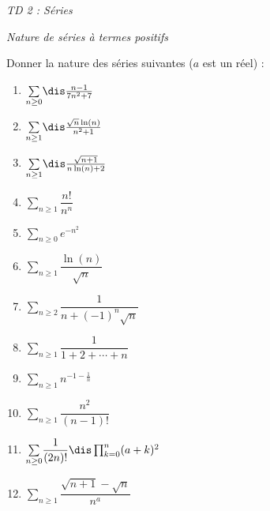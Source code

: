 \documentclass[a4paper,10pt]{report}
\newcommand{\Sum}[2]{\ensuremath{\textstyle{\sum\limits_{#1}^{#2}}}}
\begin{document}
\everymath{\displaystyle}
\begin{center}
\textit{{ {\huge TD 2 : Séries}}}
\end{center}
\bigskip


\begin{center}
\textit{{ {\large Nature de séries à termes positifs}}}
\end{center}


\begin{Exa} Donner la nature des séries suivantes ($a$ est un réel) :
\begin{multicols}{3}
\begin{enumerate}
\item $\Sum{n \geq 0}{} \dis\frac{n-1}{7n^2+7}$
\item $\Sum{n \geq 1}{}\dis\frac{\sqrt{n}\ln(n)}{n^2+1}$
\item $\Sum{n \geq 1}{}\dis\frac{\sqrt{n+1}}{n\ln(n)+2}$ 
\item $\Sum{n \geq 1}{} \dfrac{n!}{n^n} $
\columnbreak
\item $\Sum{n \geq 0}{} e^{-n^2} $
\item $\Sum{n \geq 1}{} \dfrac{\ln(n)}{\sqrt{n}} $
\item $\Sum{n \geq 2}{} \dfrac{1}{n+(-1)^n \sqrt{n}} $
\item $\Sum{n \geq 1}{} \dfrac{1}{1+2+ \cdots + n} $
\columnbreak
\item $\Sum{n \geq 1}{} n^{-1- \frac{1}{n}} $
\item $\Sum{n \geq 1}{}  \dfrac{n^2}{(n-1)!} $
\item $\Sum{n \geq 0}{} \dfrac{1}{(2n)!} \dis \prod_{k=0}^n (a+k)^2$ 
\item $\Sum{n \geq 1}{} \dfrac{\sqrt{n+1}-\sqrt{n}}{n^a}$ 
\end{enumerate}
\end{multicols}

\vspace{0.05cm}

\end{Exa}

\corr 
\end{document}
